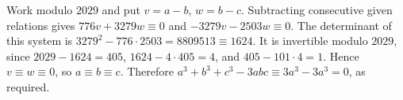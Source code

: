 Work modulo $2029$ and put $v=a-b$, $w=b-c$. Subtracting consecutive given relations gives $776v+3279w\equiv0$ and $-3279v-2503w\equiv0$. The determinant of this system is $3279^2-776\cdot2503=8809513\equiv1624$. It is invertible modulo $2029$, since $2029-1624=405$, $1624-4\cdot405=4$, and $405-101\cdot4=1$. Hence $v\equiv w\equiv0$, so $a\equiv b\equiv c$. Therefore $a^3+b^3+c^3-3abc\equiv3a^3-3a^3=0$, as required.
